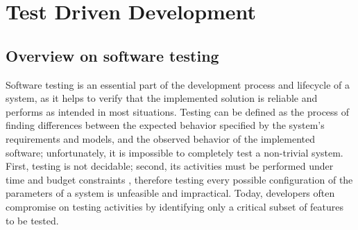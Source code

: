\chapter{Test Driven Development}
\label{chap:2_tdd}
\section{Overview on software testing}
Software testing is an essential part of the development process and lifecycle of a system, as it helps to verify that the implemented solution is reliable and performs as intended in most situations. Testing can be defined as the process of finding differences between the expected behavior specified by the system's requirements and models, and the observed behavior of the implemented software; unfortunately, it is impossible to completely test a non-trivial system. First, testing is not decidable; second, its activities must be performed under time and budget constraints \cite{OOSE}, therefore testing every possible configuration of the parameters of a system is unfeasible and impractical.
Today, developers often compromise on testing activities by identifying only a critical subset of features to be tested.

